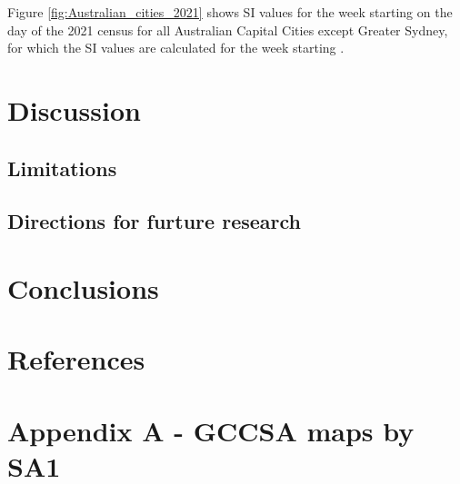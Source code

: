 \documentclass[preprint, 3p,
authoryear]{elsarticle} %
\begin{document}
Figure \ref{fig:Australian_cities_2021} shows SI values for the week
starting on the day of the 2021 census for all Australian Capital Cities
except Greater Sydney, for which the SI values are calculated for the
week starting .

\hypertarget{discussion}{%
\section{Discussion}\label{discussion}}

\hypertarget{limitations}{%
\subsection{Limitations}\label{limitations}}

\hypertarget{directions-for-furture-research}{%
\subsection{Directions for furture
research}\label{directions-for-furture-research}}

\hypertarget{conclusions}{%
\section{Conclusions}\label{conclusions}}

\hypertarget{references}{%
\section*{References}\label{references}}

\hypertarget{appendix-a---gccsa-maps-by-sa1}{%
\section{Appendix A - GCCSA maps by
SA1}\label{appendix-a---gccsa-maps-by-sa1}}

\renewcommand\refname{Holding for spare stuff}

\end{document}
